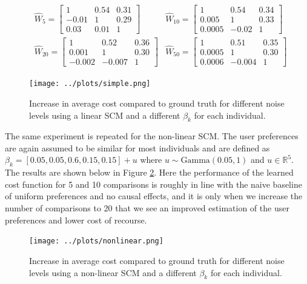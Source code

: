 \begin{align}
	& \hat{W}_5 =
	\begin{bmatrix}
		1 & 0.54 & 0.31 \\
		-0.01 & 1 & 0.29 \\
		0.03 & 0.01 & 1
	\end{bmatrix}
	\quad
	& \hat{W}_{10} =
	\begin{bmatrix}
		1 & 0.54 & 0.34 \\
		0.005 & 1 & 0.33 \\
		0.0005 & -0.02 & 1
	\end{bmatrix} \\ \nonumber
	& \hat{W}_{20} =
	\begin{bmatrix}
		1 & 0.52 & 0.36 \\
		0.001 & 1 & 0.30 \\
		-0.002 & -0.007 & 1
	\end{bmatrix}
	& \hat{W}_{50} =
	\begin{bmatrix}
		1 & 0.51 & 0.35 \\
		0.0005 & 1 & 0.30 \\
		0.0006 & -0.004 & 1
	\end{bmatrix}
\end{align}



\begin{figure}[!htb]
	\centering
	\texttt{[image: ../plots/simple.png]}
	\caption{Increase in average cost compared to ground truth for different noise levels using a linear SCM and a different $\beta_k$ for each individual.}
	\label{fig:simple}
\end{figure}

The same experiment is repeated for the non-linear SCM. The user preferences are again assumed to be similar for most individuals and are defined as $\beta_k = [0.05, 0.05, 0.6, 0.15, 0.15] + u$ where $u \sim \text{Gamma}(0.05, 1)$ and $u \in \mathbb{R}^5$. The results are shown below in Figure \ref{fig:nonlinear}. Here the performance of the learned cost function for 5 and 10 comparisons is roughly in line with the naive baseline of uniform preferences and no causal effects, and it is only when we increase the number of comparisons to 20 that we see an improved estimation of the user preferences and lower cost of recourse.


\begin{figure}[!htb]
	\centering
	\texttt{[image: ../plots/nonlinear.png]}
	\caption{Increase in average cost compared to ground truth for different noise levels using a non-linear SCM and a different $\beta_k$ for each individual.}
	\label{fig:nonlinear}
\end{figure}


